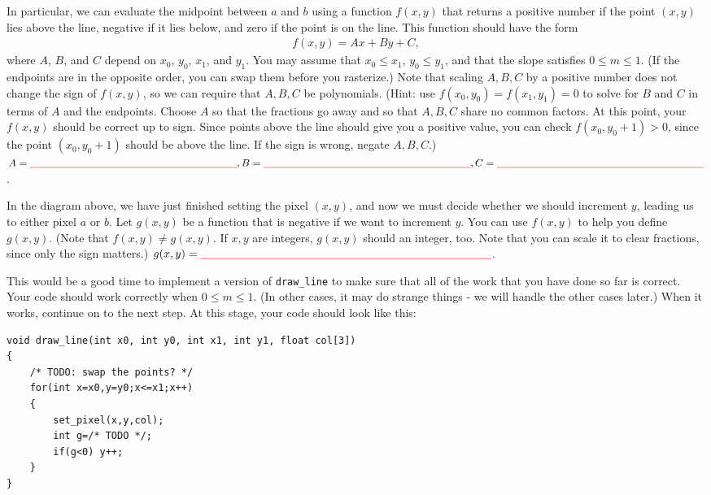 \documentclass[12pt]{article}
\newcommand{\TODOL}[1]{\textcolor{red}{\underline{\hspace{#1 cm}}}}
\begin{document}
In particular, we can evaluate the midpoint between $a$ and $b$ using a function
$f(x,y)$ that returns a positive number if the point $(x,y)$ lies above the
line, negative if it lies below, and zero if the point is on the line.  This
function should have the form
\begin{align}\label{eqn:fxy}
f(x, y) = A x + B y + C,
\end{align}
where $A$, $B$, and $C$ depend on $x_0$, $y_0$, $x_1$, and $y_1$.  You may
assume that $x_0 \le x_1$, $y_0 \le y_1$, and that the slope satisfies $0 \le m
\le 1$.  (If the endpoints are in the opposite order, you can swap them before
you rasterize.)  Note that scaling $A,B,C$ by a positive number does not change
the sign of $f(x,y)$, so we can require that $A,B,C$ be polynomials.  (Hint: use
$f(x_0,y_0) = f(x_1,y_1) = 0$ to solve for $B$ and $C$ in terms of $A$ and the
endpoints.  Choose $A$ so that the fractions go away and so that $A,B,C$ share
no common factors.  At this point, your $f(x,y)$ should be correct up to sign.
Since points above the line should give you a positive value, you can check
$f(x_0,y_0+1) > 0$, since the point $(x_0,y_0+1)$ should be above the line.  If
the sign is wrong, negate $A,B,C$.)
$A = \TODOL7, B = \TODOL7, C = \TODOL7$.

In the diagram above, we have just finished setting the pixel $(x,y)$, and now
we must decide whether we should increment $y$, leading us to either pixel $a$
or $b$.  Let $g(x,y)$ be a function that is negative if we want to increment
$y$.  You can use $f(x,y)$ to help you define $g(x,y)$.  (Note that $f(x,y) \ne
g(x,y)$.  If $x,y$ are integers, $g(x,y)$ should an integer, too.  Note that you
can scale it to clear fractions, since only the sign matters.)  $g(x,y) =\TODOL9$.



This would be a good time to implement a version of \texttt{draw\_line} to make
sure that all of the work that you have done so far is correct.  Your code
should work correctly when $0 \le m \le 1$.  (In other cases, it may do strange
things - we will handle the other cases later.)  When it works, continue on to
the next step. At this stage, your code should look like this:
\begin{lstlisting}
void draw_line(int x0, int y0, int x1, int y1, float col[3])
{
    /* TODO: swap the points? */
    for(int x=x0,y=y0;x<=x1;x++)
    {
        set_pixel(x,y,col);
        int g=/* TODO */;
        if(g<0) y++;
    }
}
\end{lstlisting}
\end{document}
